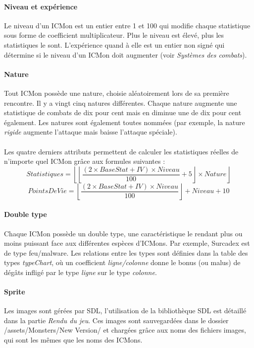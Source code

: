 \documentclass[12pt,a4paper, twoside]{article}
\begin{document}
        \paragraph{Niveau et expérience} Le niveau d'un ICMon est un entier entre 1 et 100 qui modifie chaque statistique sous forme de coefficient multiplicateur. Plus le niveau est élevé, plus les statistiques le sont. L'expérience quand à elle est un entier non signé qui détermine si le niveau d'un ICMon doit augmenter (voir \emph{Systèmes des combats}).
        \paragraph{Nature} Tout ICMon possède une nature, choisie aléatoirement lors de sa première rencontre. Il y a vingt cinq natures différentes. Chaque nature augmente une statistique de combats de dix pour cent mais en diminue une de dix pour cent également. Les natures sont également toutes nommées (par exemple, la nature \emph{rigide} augmente l'attaque mais baisse l'attaque spéciale).\\
        \paragraph{} Les quatre derniers attributs permettent de calculer les statistiques réelles de n'importe quel ICMon grâce aux formules suivantes :
        \begin{equation}
            \displaystyle{  Statistiques = \left \lfloor \left\lfloor \frac{(2 \times BaseStat + IV )\times Niveau }{100} +5 \right\rfloor \times Nature \right\rfloor  }
        \end{equation}
        \begin{equation}
            \displaystyle{  PointsDeVie = \left\lfloor \frac{(2 \times BaseStat + IV )\times Niveau}{100} \right\rfloor + Niveau + 10  }
        \end{equation}
        \paragraph{Double type} Chaque ICMon possède un double type, une caractéristique le rendant plus ou moins puissant face aux différentes espèces d'ICMons. Par exemple, Surcadex est de type feu/malware. Les relations entre les types sont définies dans la table des types \emph{typeChart}, où un coefficient \emph{ligne/colonne} donne le bonus (ou malus) de dégâts infligé par le type \emph{ligne} sur le type \emph{colonne}.
        \paragraph{Sprite} Les images sont gérées par SDL, l'utilisation de la bibliothèque SDL est détaillé dans la partie \emph{Rendu du jeu}. Ces images sont sauvegardées dans le dossier /assets/Monsters/New Version/ et chargées grâce aux noms des fichiers images, qui sont les mêmes que les noms des ICMons.
\end{document}
